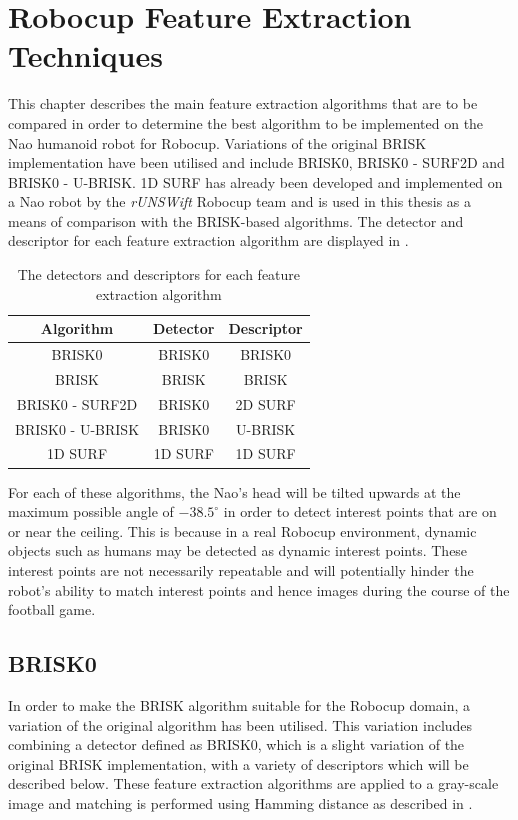 \chapter{Robocup Feature Extraction Techniques}
\label{sec:realtimeFeatureExtraction}
This chapter describes the main feature extraction algorithms that are to be compared in order to determine the best algorithm to be implemented on the Nao humanoid robot for Robocup. Variations of the original BRISK implementation \citep{Leutenegger2011} have been utilised and include BRISK0, BRISK0 - SURF2D and BRISK0 - U-BRISK. 1D SURF has already been developed and implemented on a Nao robot by the \textit{rUNSWift} Robocup team \citep{Anderson} and is used in this thesis as a means of comparison with the BRISK-based algorithms. The detector and descriptor for each feature extraction algorithm are displayed in .\\

\begin{table}
\centering
\caption{The detectors and descriptors for each feature extraction algorithm}
\begin{tabular}{|c|c|c|}
\hline 
Algorithm & Detector & Descriptor\tabularnewline
\hline 
\hline 
BRISK0 & BRISK0 & BRISK0\tabularnewline
\hline 
BRISK & BRISK & BRISK\tabularnewline
\hline 
BRISK0 - SURF2D & BRISK0 & 2D SURF\tabularnewline
\hline 
BRISK0 - U-BRISK & BRISK0 & U-BRISK\tabularnewline
\hline 
1D SURF & 1D SURF & 1D SURF\tabularnewline
\hline 
\end{tabular}
\label{tab:detector_descriptor}
\end{table}


For each of these algorithms, the Nao's head will be tilted upwards at the maximum possible angle of $-38.5^{\circ}$ \citep{NaoHead} in order to detect interest points that are on or near the ceiling. This is because in a real Robocup environment, dynamic objects such as humans may be detected as dynamic interest points. These interest points are not necessarily repeatable and will potentially hinder the robot's  ability to match interest points and hence images during the course of the football game.\\

\section{BRISK0}
\label{sec:brisk0}
In order to make the BRISK algorithm suitable for the Robocup domain, a variation of the original algorithm has been utilised. This variation includes combining a detector defined as BRISK0, which is a slight variation of the original BRISK implementation, with a variety of descriptors which will be described below. These feature extraction algorithms are applied to a gray-scale image and matching is performed using Hamming distance as described in .\\

